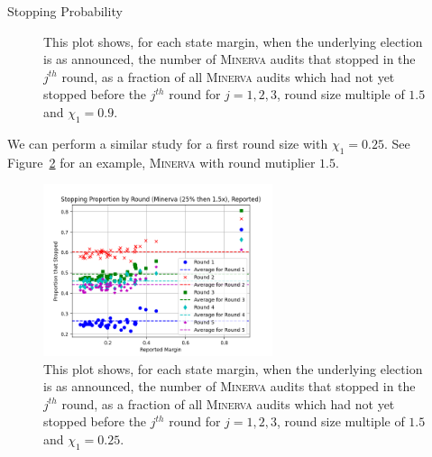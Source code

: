 \documentclass[final]{beamer}
\newcommand{\Minerva}{\textsc{Minerva}\xspace}
\newlength{\colwidth}
\begin{document}
\begin{frame}[t]
\begin{columns}[t]
\begin{column}{\colwidth}
\begin{block}{Stopping Probability}
\begin{figure}[h]
\begin{minipage}{.49\textwidth}
\begin{centering}
\caption{This plot shows, for each state margin, when the underlying election is as announced, the number of \Minerva audits that stopped in the $j^{th}$ round,
as a fraction of all \Minerva audits which had not yet stopped before the $j^{th}$ round for $j=1,2,3$, round size multiple of $1.5$ and $\chi_1=0.9$.}
\label{fig:minerva1p5_sprob}
\end{centering}
\end{minipage}
\end{figure}

We can perform a similar study for a first round size with $\chi_1=0.25$. 
See Figure~\ref{fig:minerva_25} for an example, \Minerva with round mutiplier $1.5$. 

\begin{figure}
\begin{centering}
\includegraphics[width=0.6\textwidth]{minerva25percthen1p5_sprob.png}
\caption{This plot shows, for each state margin, when the underlying election is as announced, the number of \Minerva audits that stopped in the $j^{th}$ round,
as a fraction of all \Minerva audits which had not yet stopped before the $j^{th}$ round for $j=1,2,3$, round size multiple of $1.5$ and $\chi_1 = 0.25$.}
\label{fig:minerva_25}
\end{centering}
\end{figure}

  \end{block}


\end{column}
\end{columns}
\end{frame}
\end{document}
